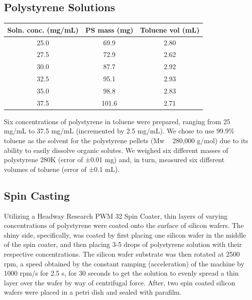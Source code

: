 \documentclass{article}
\newenvironment{Table}
  {\par\medskip\noindent\minipage{\linewidth}}
  {\endminipage\par\medskip}
\begin{document}
\begin{multicols}{2}
            \subsection{Polystyrene Solutions}

                \begin{Table}
                    \centering
                    \begin{tabular}{@{}ccc@{}}
                        \toprule
                        Soln. conc. (mg/mL) & PS mass (mg) & Toluene vol (mL) \\ \midrule
                        25.0                           & 69.9                  & 2.80                \\
                        27.5                           & 72.9                  & 2.62                \\
                        30.0                           & 87.7                  & 2.92                \\
                        32.5                           & 95.1                  & 2.93                \\
                        35.0                           & 98.8                  & 2.83                \\
                        37.5                           & 101.6                 & 2.71                \\ \bottomrule
                    \end{tabular}
                \end{Table}

                Six concentrations of polystyrene in toluene were prepared, ranging from 25 mg/mL to 37.5 mg/mL (incremented by 2.5 mg/mL). We chose to use 99.9\% toluene as the solvent for the polystyrene pellets (Mw ~ 280,000 g/mol) due to its ability to easily dissolve organic solutes. We weighed six different masses of polystyrene 280K (error of ±0.01 mg) and, in turn, measured six different volumes of toluene (error of ±0.1 mL).

            \subsection{Spin Casting}
                Utilizing a Headway Research PWM 32 Spin Coater, thin layers of varying concentrations of polystyrene were coated onto the surface of silicon wafers. The shiny side, specifically, was coated by first placing one silicon wafer in the middle of the spin coater, and then placing 3­-5 drops of polystyrene solution with their respective concentrations. The silicon wafer substrate was then rotated at 2500 rpm, a speed obtained by the constant ramping (acceleration) of the machine by 1000 rpm/s for 2.5 s, for 30 seconds to get the solution to evenly spread a thin layer over the wafer by way of centrifugal force. After, two spin coated silicon wafers were placed in a petri dish and sealed with parafilm. 


\end{multicols}
\end{document}
